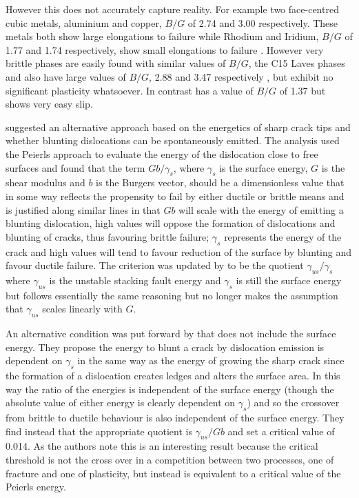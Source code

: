 However this does not accurately capture reality. For example two face-centred cubic metals, aluminium and copper, $B/G$ of 2.74 and 3.00 respectively. These metals both show large elongations to failure while Rhodium and Iridium, $B/G$ of 1.77 and 1.74 respectively, show small elongations to failure \cite{Pugh1954}. However very brittle phases are easily found with similar values of $B/G$, the C15 Laves phases \cite{Stein2004,Stein2005}  and  also have large values of $B/G$, 2.88 and 3.47 respectively \cite{Chu1995}, but exhibit no significant plasticity whatsoever. In contrast  has a value of $B/G$ of 1.37 \cite{Barsoum2011} but shows very easy slip.






\citet{rice1974} suggested an alternative approach based on the energetics of sharp crack tips and whether blunting dislocations can be spontaneously emitted. The analysis used the Peierls approach to evaluate the energy of the dislocation close to free surfaces and found that the term $Gb/\gamma_s$, where $\gamma_s$ is the surface energy, $G$ is the shear modulus and $b$ is the Burgers vector, should be a dimensionless value that in some way reflects the propensity to fail by either ductile or brittle means and is justified along similar lines in that $Gb$ will scale with the energy of emitting a blunting dislocation, high values will oppose the formation of dislocations and blunting of cracks, thus favouring brittle failure; $\gamma_s$ represents the energy of the crack and high values will tend to favour reduction of the surface by blunting and favour ductile failure. The criterion was updated by \citet{Rice1992} to be the quotient $\gamma_{us}/ \gamma_s$ where $\gamma_{us}$ is the unstable stacking fault energy and $\gamma_s$ is still the surface energy but follows essentially the same reasoning but no longer makes the assumption that $\gamma_{us}$ scales linearly with $G$.

An alternative condition was put forward by \citet{Zhou1994} that does not include the surface energy. They propose the energy to blunt a crack by dislocation emission is dependent on $\gamma_s$ in the same way as the energy of growing the sharp crack since the formation of a dislocation creates ledges and alters the surface area. In this way the ratio of the energies is independent of the surface energy (though the absolute value of either energy is clearly dependent on $\gamma_s$) and so the crossover from brittle to ductile behaviour is also independent of the surface energy. They find instead that the appropriate quotient is $\gamma_{us} / Gb$ and set a critical value of 0.014. As the authors note this is an interesting result because the critical threshold is not the cross over in a competition between two processes, one of fracture and one of plasticity, but instead is equivalent to a critical value of the Peierls energy.

